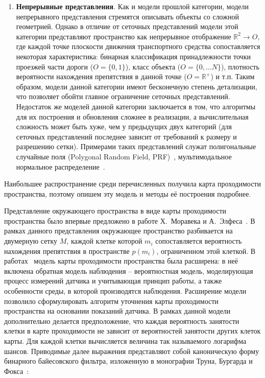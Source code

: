 \begin{enumerate}
	\item \textbf{Непрерывные представления}. Как и модели прошлой категории, модели непрерывного представления стремятся описывать объекты со сложной геометрией. Однако в отличие от сеточных представлений модели этой категории представляют пространство как непрерывное отображение $\mathbb{R}^2 \rightarrow O$, где каждой точке плоскости движения транспортного средства сопоставляется некоторая характеристика: бинарная классификация принадлежности точки проезжей части дороги ($O=\{0,1\}$), класс объекта ($O=\{0,\dots N\}$), плотность вероятности нахождения препятствия в данной точке ($O=\mathbb{R}^+$) и т.п. Таким образом, модели данной категории имеют бесконечную степень детализации, что позволяет обойти главное ограничение сеточных представлений. Недостаток же моделей данной категории заключается в том, что алгоритмы для их построения и обновления сложнее в реализации, а вычислительная сложность может быть хуже, чем у предыдущих двух категорий (для сеточных представлений последнее зависит от требований к размеру и разрешению сетки). Примерами таких представлений служат полигональные случайные поля (Polygonal Random Field, PRF)~\cite{paskin2012robotic}, мультимодальное нормальное распределение~\cite{yuan2023generating}.
\end{enumerate}

Наибольшее распространение среди перечисленных получила карта проходимости пространства, поэтому опишем эту модель и методы её построения подробнее.

Представление окружающего пространства в виде карты проходимости пространства было впервые предложено в работе Х.~Моравека и А.~Элфеса~\cite{moravec1985high}. В рамках данного представления окружающее пространство разбивается на двумерную сетку $M$, каждой клетке которой $m_i$ сопоставляется вероятность нахождения препятствия в пространстве $p(m_i)$, ограниченном этой клеткой. В работах~\cite{elfes1989occupancy, Moravec_1988} модель карты проходимости пространства была расширена: в неё включена обратная модель наблюдения -- вероятностная модель, моде­лирующая процесс измерений датчика и учитывающая принцип работы, а также особенности среды, в которой производятся наблюдения. Расширение модели позволило сформулировать алгоритм уточнения карты проходимости пространства на основании показаний датчика. В рамках данной модели дополнительно делается предположение, что каждая вероятность занятости клетки в карте проходимости не зависит от вероятностей занятости других клеток карты. Для каждой клетки вычисляется величина так называемого логарифма шансов. Приводимые далее выражения представляют собой каноническую форму бинарного байесовского фильтра, изложенную в монографии Труна, Бургарда и Фокса~\cite{thrun2005probabilistic}:

